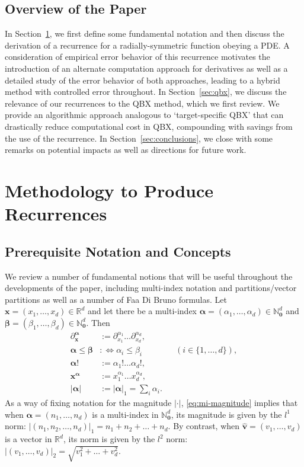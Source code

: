 \documentclass[12pt]{article}
\def\N{{\mathbb N}}
\def\R{{\mathbb R}}
\let\b=\boldsymbol
\def\bhat#1{\hat{\boldsymbol{#1}}}
\theoremstyle{definition}
\theoremstyle{plain}
\theoremstyle{definition}
\begin{document}
\subsection{Overview of the Paper}

In Section~\ref{sec:making-recurrences}, we first define some fundamental notation and then discuss the derivation of a recurrence for a radially-symmetric function obeying a PDE. A consideration of empirical error behavior of this recurrence motivates the introduction of an alternate computation approach for derivatives as well as a detailed study of the error behavior of both approaches, leading to a hybrid method with controlled error throughout. In Section~\ref{sec:qbx}, we discuss the relevance of our recurrences to the QBX method, which we first review. We provide an algorithmic approach analogous to `target-specific QBX' that can drastically reduce computational cost in QBX, compounding with savings from the use of the recurrence. In Section~\ref{sec:conclusions}, we close with some remarks on potential impacts as well as directions for future work.

\section{Methodology to Produce Recurrences}
\label{sec:making-recurrences}


\subsection{Prerequisite Notation and Concepts}
\label{sec:notation}
We review a number of fundamental notions that will be useful throughout the developments of the paper, including multi-index notation and partitions/vector partitions as well as a number of Faa Di Bruno formulas. Let ${\b x} = (x_1, \dots, x_d) \in \R^d$ and let there be a multi-index $\b\alpha = (\alpha_1, \dots, \alpha_d) \in \N^d_{\b{0}}$ and $\b\beta = (\beta_1, \dots, \beta_d) \in \N^d_{\b{0}}$. Then
\begin{align}
\partial^{\b\alpha}_{{\b x}} &:= \partial^{\alpha_1}_{x_1} \dots \partial^{\alpha_d}_{x_d},\\
\b\alpha \leq \b\beta &:\Leftrightarrow \alpha_i \leq \beta_i \qquad  \qquad(i \in \{1, \dots, d\}),\\
\b\alpha ! &:= \alpha_1 ! \dots \alpha_d !,\\
{\b x}^{\b\alpha} &:= x_1^{\alpha_1} \dots x_d^{\alpha_d},\\
|\b{\alpha}| &:= |\b{\alpha}|_1 =  \sum_i \alpha_i. \label{eq:mi-magnitude}
\end{align}
As a way of fixing notation for the magnitude $|\cdot|$, \eqref{eq:mi-magnitude} implies that when $\b{\alpha} = (n_1, \dots, n_d)$ is a multi-index in $\N^d_{\b{0}}$, its magnitude is given by the $l^1$ norm: $|(n_1, n_2, \dots, n_d)|_1 = n_1 + n_2 + \dots + n_d$. By contrast, when $\bhat v = (v_1, \dots, v_d)$ is a vector in $\R^d$, its norm is given by the $l^2$ norm: $|(v_1, \dots, v_d)|_2 = \sqrt{v_1^2 + \dots + v_d^2}$.
\end{document}
